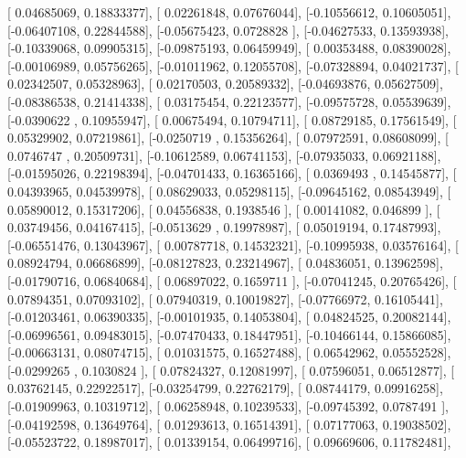 \documentclass{article}
\begin{document}
       [ 0.04685069,  0.18833377],
       [ 0.02261848,  0.07676044],
       [-0.10556612,  0.10605051],
       [-0.06407108,  0.22844588],
       [-0.05675423,  0.0728828 ],
       [-0.04627533,  0.13593938],
       [-0.10339068,  0.09905315],
       [-0.09875193,  0.06459949],
       [ 0.00353488,  0.08390028],
       [-0.00106989,  0.05756265],
       [-0.01011962,  0.12055708],
       [-0.07328894,  0.04021737],
       [ 0.02342507,  0.05328963],
       [ 0.02170503,  0.20589332],
       [-0.04693876,  0.05627509],
       [-0.08386538,  0.21414338],
       [ 0.03175454,  0.22123577],
       [-0.09575728,  0.05539639],
       [-0.0390622 ,  0.10955947],
       [ 0.00675494,  0.10794711],
       [ 0.08729185,  0.17561549],
       [ 0.05329902,  0.07219861],
       [-0.0250719 ,  0.15356264],
       [ 0.07972591,  0.08608099],
       [ 0.0746747 ,  0.20509731],
       [-0.10612589,  0.06741153],
       [-0.07935033,  0.06921188],
       [-0.01595026,  0.22198394],
       [-0.04701433,  0.16365166],
       [ 0.0369493 ,  0.14545877],
       [ 0.04393965,  0.04539978],
       [ 0.08629033,  0.05298115],
       [-0.09645162,  0.08543949],
       [ 0.05890012,  0.15317206],
       [ 0.04556838,  0.1938546 ],
       [ 0.00141082,  0.046899  ],
       [ 0.03749456,  0.04167415],
       [-0.0513629 ,  0.19978987],
       [ 0.05019194,  0.17487993],
       [-0.06551476,  0.13043967],
       [ 0.00787718,  0.14532321],
       [-0.10995938,  0.03576164],
       [ 0.08924794,  0.06686899],
       [-0.08127823,  0.23214967],
       [ 0.04836051,  0.13962598],
       [-0.01790716,  0.06840684],
       [ 0.06897022,  0.1659711 ],
       [-0.07041245,  0.20765426],
       [ 0.07894351,  0.07093102],
       [ 0.07940319,  0.10019827],
       [-0.07766972,  0.16105441],
       [-0.01203461,  0.06390335],
       [-0.00101935,  0.14053804],
       [ 0.04824525,  0.20082144],
       [-0.06996561,  0.09483015],
       [-0.07470433,  0.18447951],
       [-0.10466144,  0.15866085],
       [-0.00663131,  0.08074715],
       [ 0.01031575,  0.16527488],
       [ 0.06542962,  0.05552528],
       [-0.0299265 ,  0.1030824 ],
       [ 0.07824327,  0.12081997],
       [ 0.07596051,  0.06512877],
       [ 0.03762145,  0.22922517],
       [-0.03254799,  0.22762179],
       [ 0.08744179,  0.09916258],
       [-0.01909963,  0.10319712],
       [ 0.06258948,  0.10239533],
       [-0.09745392,  0.0787491 ],
       [-0.04192598,  0.13649764],
       [ 0.01293613,  0.16514391],
       [ 0.07177063,  0.19038502],
       [-0.05523722,  0.18987017],
       [ 0.01339154,  0.06499716],
       [ 0.09669606,  0.11782481],
\end{document}
